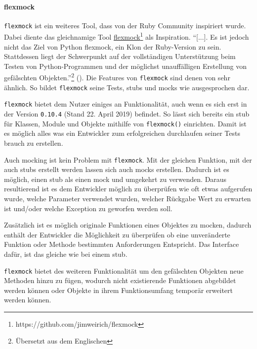 \paragraph{flexmock}\label{python-tools:flexmock}\mbox{}
\newline
\lstinline{flexmock} ist ein weiteres Tool, dass von der Ruby Community
inspiriert wurde. Dabei diente das gleichnamige Tool
\href{https://github.com/jimweirich/flexmock}{flexmock}\footnote{https://github.com/jimweirich/flexmock}
als Inspiration. "`[...]. Es ist jedoch nicht das Ziel von Python flexmock, ein
Klon der Ruby-Version zu sein. Stattdessen liegt der Schwerpunkt auf der
vollständigen Unterstützung beim Testen von Python-Programmen und der möglichst
unauffälligen Erstellung von gefälschten Objekten."'\footnote{Übersetzt aus dem Englischen}
(\cite{flexmock:docs:0.10.3}). Die Features von \lstinline{flexmock} sind denen
von  sehr ähnlich. So bildet \lstinline{flexmock}
seine Tests, \glspl{stub} und \glspl{mock} wie ausgesprochen dar.
\newline

\lstinline{flexmock} bietet dem Nutzer einiges an Funktionalität, auch wenn es
sich erst in der Version \lstinline{0.10.4} (Stand 22. April 2019) befindet. So
lässt sich bereits ein \Gls{stub} für Klassen, Module und Objekte mithilfe von
\lstinline{flexmock()} einrichten. Damit ist es möglich alles was ein Entwickler
zum erfolgreichen durchlaufen seiner Tests brauch zu erstellen.

Auch \gls{mock}ing ist kein Problem mit \lstinline{flexmock}. Mit der gleichen
Funktion, mit der auch \Glspl{stub} erstellt werden lassen sich auch
\Glspl{mock} erstellen. Dadurch ist es möglich, einen \Gls{stub} als einen
\Gls{mock} und umgekehrt zu verwenden. Daraus resultierend ist es dem
Entwickler möglich zu überprüfen wie oft etwas aufgerufen wurde, welche
Parameter verwendet wurden, welcher Rückgabe Wert zu erwarten ist und/oder
welche Exception zu geworfen werden soll.

Zusätzlich ist es möglich originale Funktionen eines Objektes zu
\gls{mock}en, dadurch enthält der Entwickler die Möglichkeit
zu überprüfen ob eine unveränderte Funktion oder Methode bestimmten
Anforderungen Entspricht. Das Interface dafür, ist das gleiche wie bei einem
\Gls{stub}.

\lstinline{flexmock} bietet des weiteren Funktionalität um den gefälschten
Objekten neue Methoden hinzu zu fügen, wodurch nicht existierende Funktionen
abgebildet werden können oder Objekte in ihrem Funktionsumfang temporär
erweitert werden können.
\newline


